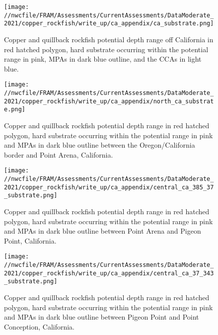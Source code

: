 \documentclass[11pt,
  english,
  a4paper,
]{article}
\begin{document}

\begin{figure}
\centering
\texttt{[image: //nwcfile/FRAM/Assessments/CurrentAssessments/DataModerate\_2021/copper\_rockfish/write\_up/ca\_appendix/ca\_substrate.png]}
\caption{Copper and quillback rockfish potential depth range off California in red hatched polygon, hard substrate occurring within the potential range in pink, MPAs in dark blue outline, and the CCAs in light blue.\label{fig:ca-all-app}}
\end{figure}

\tagmcend\tagstructend


\begin{figure}
\centering
\texttt{[image: //nwcfile/FRAM/Assessments/CurrentAssessments/DataModerate\_2021/copper\_rockfish/write\_up/ca\_appendix/north\_ca\_substrate.png]}
\caption{Copper and quillback rockfish potential depth range in red hatched polygon, hard substrate occurring within the potential range in pink and MPAs in dark blue outline between the Oregon/California border and Point Arena, California.\label{fig:north-ca-app}}
\end{figure}

\tagmcend\tagstructend


\begin{figure}
\centering
\texttt{[image: //nwcfile/FRAM/Assessments/CurrentAssessments/DataModerate\_2021/copper\_rockfish/write\_up/ca\_appendix/central\_ca\_385\_37\_substrate.png]}
\caption{Copper and quillback rockfish potential depth range in red hatched polygon, hard substrate occurring within the potential range in pink and MPAs in dark blue outline between Point Arena and Pigeon Point, California.\label{fig:central-ca-north-app}}
\end{figure}

\tagmcend\tagstructend


\begin{figure}
\centering
\texttt{[image: //nwcfile/FRAM/Assessments/CurrentAssessments/DataModerate\_2021/copper\_rockfish/write\_up/ca\_appendix/central\_ca\_37\_343\_substrate.png]}
\caption{Copper and quillback rockfish potential depth range in red hatched polygon, hard substrate occurring within the potential range in pink and MPAs in dark blue outline between Pigeon Point and Point Conception, California.\label{fig:central-ca-south-app}}
\end{figure}
\end{document}
